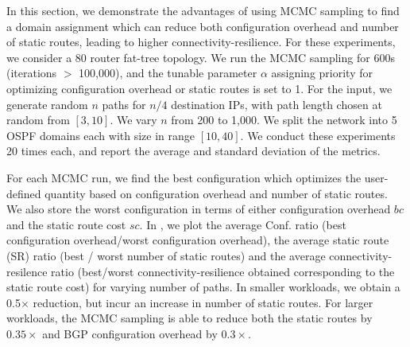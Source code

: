 In this section, we demonstrate the advantages of using MCMC sampling
to find a domain assignment which can  
reduce both configuration overhead and number of static routes, 
leading to higher connectivity-resilience. 
For these experiments,
we consider a
80 router fat-tree topology. 
We run the MCMC sampling for 600s
(iterations $>$ 100,000), 
and the tunable parameter $\alpha$ assigning
priority for optimizing configuration 
overhead or static routes is set
to 1. For the input, we generate 
random $n$ paths for $n/4$
destination IPs, with path
 length chosen at random from $[3,10]$. 
We vary $n$ from 200 to 1,000.
We
split the network into 5 OSPF domains 
each with size in range $[10,40]$. We
conduct these experiments 20 times each, 
and report the average and
standard deviation of the metrics.

%
For each MCMC run, we find the best configuration
which optimizes the user-defined quantity based on 
configuration overhead and number of static routes. 
We also store the worst configuration in terms of either
configuration overhead $bc$ and the static route cost 
$sc$. In , we plot the average Conf. ratio 
(best configuration overhead/worst configuration overhead), 
the average static route (SR) ratio 
(best / worst number of static routes) and the average 
connectivity-resilence ratio (best/worst connectivity-resilience obtained corresponding to the 
static route cost)
for varying number of paths. 
In smaller workloads, we obtain a 0.5$\times$ reduction, 
but incur an increase in number of static routes. For 
larger workloads, the MCMC sampling is able to
reduce both the static routes by $0.35\times$ and 
BGP configuration overhead by $0.3\times$. 



